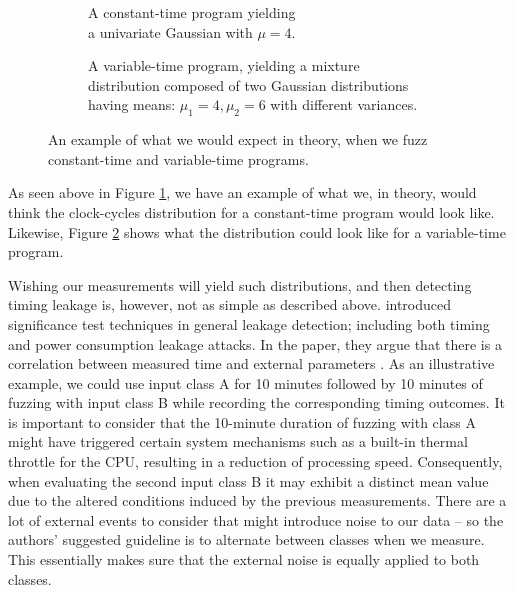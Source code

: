 \def\gausssolution{5.170045172}
\begin{figure}[H]
\captionsetup[subfigure]{justification=centering}
\begin{subfigure}[t]{0.50\textwidth}
\resizebox{\linewidth}{!}{
    
}%
\caption{A constant-time program yielding\\a univariate Gaussian with $\mu = 4$.}
\label{fig:univargauss}
\end{subfigure}
\begin{subfigure}[t]{0.50\textwidth}
\resizebox{\linewidth}{!}{
    
}%
\caption{A variable-time program, yielding a mixture\\distribution composed of two Gaussian distributions\\having means: $\mu_1 = 4, \mu_2 = 6$ with different variances.}
\label{fig:mixdisgauss}
\end{subfigure}
\caption{An example of what we would expect in theory, when we fuzz constant-time and variable-time programs.}
\label{fig:fuzzclass-statistics-example}
\end{figure}
As seen above in Figure \ref{fig:univargauss}, we have an example of what we, in theory, would think the clock-cycles distribution for a constant-time program would look like. Likewise, Figure \ref{fig:mixdisgauss} shows what the distribution could look like for a variable-time program.

Wishing our measurements will yield such distributions, and then detecting timing leakage is, however, not as simple as described above. \citeauthor{Coron_2004} introduced significance test techniques in general leakage detection; including both timing and power consumption leakage attacks. In the paper, they argue that there is a correlation between measured time and external parameters \citep{Coron_2004}. As an illustrative example, we could use input class A for 10 minutes followed by 10 minutes of fuzzing with input class B while recording the corresponding timing outcomes. It is important to consider that the 10-minute duration of fuzzing with class A might have triggered certain system mechanisms such as a built-in thermal throttle for the CPU, resulting in a reduction of processing speed. Consequently, when evaluating the second input class B it may exhibit a distinct mean value due to the altered conditions induced by the previous measurements. There are a lot of external events to consider that might introduce noise to our data -- so the authors' suggested guideline is to alternate between classes when we measure. This essentially makes sure that the external noise is equally applied to both classes.


